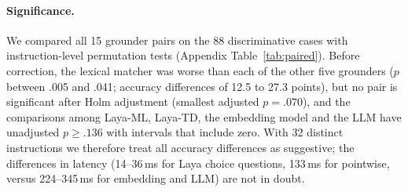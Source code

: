 \documentclass[11pt,a4paper]{article}
\begin{document}
\begin{table}[t]\centering\small

\caption{Top-1 accuracy with 95\% instruction-level (cluster) bootstrap intervals on the 88 discriminative cases (32 distinct instructions) and on all 144 logged decisions (38 instructions); warm latency over all cases (median and 95th percentile), each grounder run alone.}\label{tab:ground}
\end{table}
\begin{table}[t]\centering\small

\caption{Correct decisions by slice (denominators: Dev 14, Todo B--E 56, Checkout 56, Live 18; Literal/Natural 35 each). Dev = todo variant~A.}\label{tab:slices}
\end{table}

\paragraph{Significance.} We compared all 15 grounder pairs on the 88 discriminative cases with instruction-level permutation tests (Appendix Table~\ref{tab:paired}). Before correction, the lexical matcher was worse than each of the other five grounders ($p$ between .005 and .041; accuracy differences of 12.5 to 27.3 points), but no pair is significant after Holm adjustment (smallest adjusted $p=.070$), and the comparisons among Laya-ML, Laya-TD, the embedding model and the LLM have unadjusted $p\ge.136$ with intervals that include zero. With 32 distinct instructions we therefore treat all accuracy differences as suggestive; the differences in latency (14--36\,ms for Laya choice questions, 133\,ms for pointwise, versus 224--345\,ms for embedding and LLM) are not in doubt.
\end{document}
